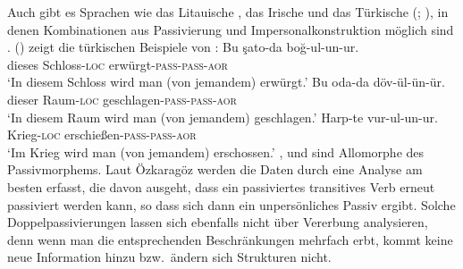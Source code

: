 Auch gibt es Sprachen wie das Litauische \citep[Abschnitt~5]{Timberlake82a}, das
Irische \citep{Noonan94a} und das Türkische (\citealp{Ozkaragoez86a};
\citealp[Abschnitt~2.3.3]{Knecht85a-u}), in denen Kombinationen aus Passivierung und
Impersonalkonstruktion möglich sind \citep{Blevins2003a}. () zeigt
die türkischen Beispiele von \citet[]{Ozkaragoez86a}:
\eal
\ex\label{ex-double-passivization-strangle}
\gll Bu şato-da boğ-ul-un-ur.\\
     dieses Schloss-\textsc{loc} erwürgt-\textsc{pass}-\textsc{pass}-\textsc{aor}\\
\glt `In diesem Schloss wird man (von jemandem) erwürgt.'
\ex\label{ex-double-passivization-hit}
\gll Bu oda-da döv-ül-ün-ür.\\
     dieser Raum-\textsc{loc} geschlagen-\textsc{pass}-\textsc{pass}-\textsc{aor}\\
\glt `In diesem Raum wird man (von jemandem) geschlagen.'
\ex
\gll Harp-te vur-ul-un-ur.\\
     Krieg-\textsc{loc} erschießen-\textsc{pass}-\textsc{pass}-\textsc{aor}\\
\glt `Im Krieg wird man (von jemandem) erschossen.'
\zl
{},  und  sind Allomorphe des Passivmorphems. Laut Özkaragöz werden
die Daten durch eine Analyse am besten erfasst, die davon ausgeht, dass ein passiviertes transitives
Verb erneut passiviert werden kann, so dass sich dann ein unpersönliches Passiv ergibt. Solche
Doppelpassivierungen lassen sich ebenfalls nicht über Vererbung analysieren, denn wenn man die
entsprechenden Beschränkungen mehrfach erbt, kommt keine neue Information hinzu bzw.\ ändern sich
Strukturen nicht.

